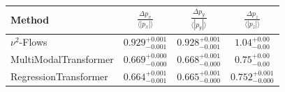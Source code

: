     \begin{tabular}{lccc}
        \toprule
        Method & $\frac{\Delta p_x}{\langle |p_x|\rangle}$ & $\frac{\Delta p_y}{\langle |p_y|\rangle}$ & $\frac{\Delta p_z}{\langle |p_z|\rangle}$ \\
        \midrule
        $\nu^2$-Flows & $0.929_{-0.001}^{+0.001}$ & $0.928_{-0.001}^{+0.001}$ & $1.04_{-0.00}^{+0.00}$ \\
        MultiModalTransformer & $0.669_{-0.000}^{+0.000}$ & $0.668_{-0.000}^{+0.001}$ & $0.75_{-0.00}^{+0.00}$ \\
        RegressionTransformer & $0.664_{-0.001}^{+0.001}$ & $0.665_{-0.000}^{+0.001}$ & $0.752_{-0.000}^{+0.001}$ \\
        \bottomrule
    \end{tabular}